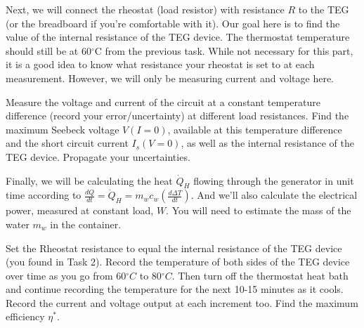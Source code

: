 \documentclass[
  letterpaper,
  DIV=11,
  numbers=noendperiod]{scrreprt}
\begin{document}
Next, we will connect the rheostat (load resistor) with resistance \(R\)
to the TEG (or the breadboard if you're comfortable with it). Our goal
here is to find the value of the internal resistance of the TEG device.
The thermostat temperature should still be at \(60{^\circ}\)C from the
previous task. While not necessary for this part, it is a good idea to
know what resistance your rheostat is set to at each measurement.
However, we will only be measuring current and voltage here.

\begin{tcolorbox}[enhanced jigsaw, toprule=.15mm, coltitle=black, bottomrule=.15mm, colbacktitle=quarto-callout-note-color!10!white, opacitybacktitle=0.6, titlerule=0mm, colframe=quarto-callout-note-color-frame, title={Task 2}, leftrule=.75mm, bottomtitle=1mm, breakable, opacityback=0, arc=.35mm, left=2mm, colback=white, rightrule=.15mm, toptitle=1mm]

Measure the voltage and current of the circuit at a constant temperature
difference (record your error/uncertainty) at different load
resistances. Find the maximum Seebeck voltage \(V(I = 0)\), available at
this temperature difference and the short circuit current
\(I_{s}(V = 0)\), as well as the internal resistance of the TEG device.
Propagate your uncertainties.

\end{tcolorbox}

Finally, we will be calculating the heat \(\dot{Q}_{H}\) flowing through
the generator in unit time according to
\(\frac{dQ}{dt} = \dot{Q}_{H} = m_{w}c_{w}\left( \frac{d\Delta T}{dt} \right)\).
And we'll also calculate the electrical power, measured at constant
load, \(W\). You will need to estimate the mass of the water \(m_{w}\)
in the container.

\begin{tcolorbox}[enhanced jigsaw, toprule=.15mm, coltitle=black, bottomrule=.15mm, colbacktitle=quarto-callout-note-color!10!white, opacitybacktitle=0.6, titlerule=0mm, colframe=quarto-callout-note-color-frame, title={Task 3}, leftrule=.75mm, bottomtitle=1mm, breakable, opacityback=0, arc=.35mm, left=2mm, colback=white, rightrule=.15mm, toptitle=1mm]

Set the Rheostat resistance to equal the internal resistance of the TEG
device (you found in Task 2). Record the temperature of both sides of
the TEG device over time as you go from \(60{^\circ}C\) to
\(80{^\circ}C\). Then turn off the thermostat heat bath and continue
recording the temperature for the next 10-15 minutes as it cools. Record
the current and voltage output at each increment too. Find the maximum
efficiency \(\eta^{*}\).

\end{tcolorbox}
\end{document}
